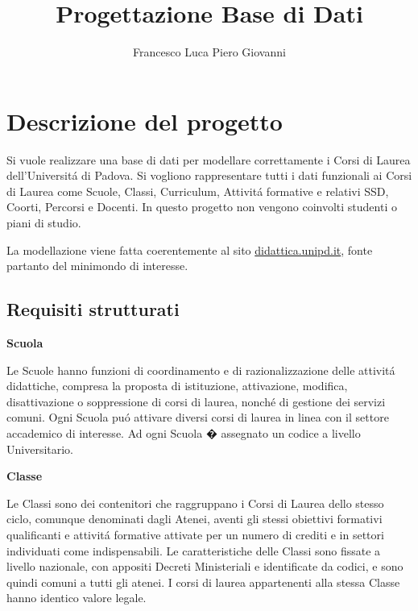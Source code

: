 \documentclass[a4paper,12pt,italian,towside]{article}
\title{Progettazione Base di Dati}
\author{Francesco Luca Piero Giovanni}
\date{}
\begin{document}
\maketitle
\newpage

\tableofcontents

\newpage
\section{Descrizione del progetto}
Si vuole realizzare una base di dati per modellare correttamente i Corsi di Laurea dell'Universit\'a di Padova.
Si vogliono rappresentare tutti i dati funzionali ai Corsi di Laurea come Scuole, Classi, Curriculum, Attivit\'a formative e relativi SSD, Coorti, Percorsi e Docenti.
In questo progetto non vengono coinvolti studenti o piani di studio.
\par
La modellazione viene fatta coerentemente al sito  \href{https://didattica.unipd.it/}{didattica.unipd.it}, fonte partanto del minimondo di interesse.



\subsection{Requisiti strutturati}

\textbf{Scuola}
\par Le Scuole hanno funzioni di coordinamento e di razionalizzazione delle attivit\'a didattiche, compresa la proposta di istituzione, attivazione, modifica, disattivazione o soppressione di corsi di laurea, nonch\'e di gestione dei servizi comuni. Ogni Scuola pu\'o attivare diversi corsi di laurea in linea con il settore accademico di interesse. Ad ogni Scuola � assegnato un codice a livello Universitario.
\newline

\textbf{Classe}
\par
Le Classi sono dei contenitori che raggruppano i Corsi di Laurea dello stesso ciclo, comunque denominati dagli Atenei, aventi gli stessi obiettivi formativi qualificanti e attivit\'a formative attivate per un numero di crediti e in settori individuati come indispensabili. Le caratteristiche delle Classi sono fissate a livello nazionale, con appositi Decreti Ministeriali e identificate da codici, e sono quindi comuni a tutti gli atenei. I corsi di laurea appartenenti alla stessa Classe hanno identico valore legale.
\\
\end{document}
